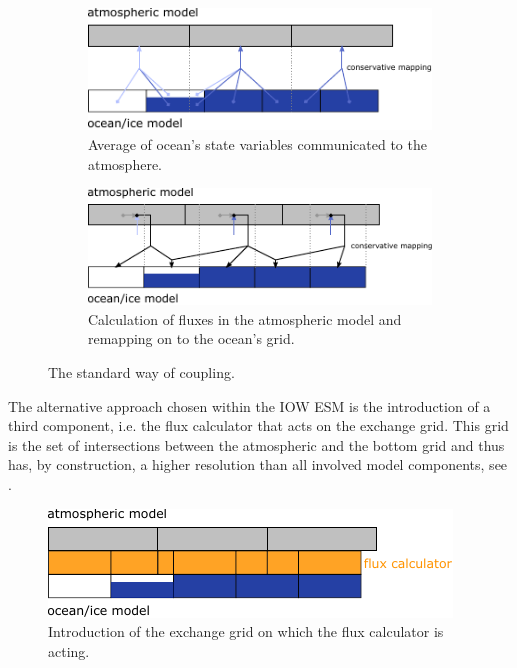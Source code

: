 \documentclass[a4paper,titlepage]{scrartcl}
\begin{document}
\begin{figure}[H]
	\centering
    \begin{subfigure}[t]{0.48\textwidth}
        \centering
		\includegraphics[width=\linewidth]{"./figures/conservative_mapping1.pdf"} 
		\caption{
		\label{fig:conservative_mapping1}
		Average of ocean's state variables communicated to the atmosphere.
		}
		\end{subfigure}
    \hfill
    \begin{subfigure}[t]{0.48\textwidth}
        \centering
		\includegraphics[width=\linewidth]{"./figures/conservative_mapping2.pdf"}
		\caption{
		\label{fig:conservative_mapping2}
		Calculation of fluxes in the atmospheric model and remapping on to the ocean's grid.
		}
	\end{subfigure}
	\caption{The standard way of coupling.}
\end{figure}

The alternative approach chosen within the IOW ESM is the introduction of a third component, i.e. the flux calculator that acts on the exchange grid.
%
This grid is the set of intersections between the atmospheric and the bottom grid and thus has, by construction, 
a higher resolution than all involved model components, see .

\begin{figure}[H]
	\centering
	\includegraphics[width=0.48\linewidth]{"./figures/grids1D_plus_exchange.pdf"} 
	\caption{
	\label{fig:grids1D_plus_exchange}
	Introduction of the exchange grid on which the flux calculator is acting.
	}
\end{figure}
\end{document}
